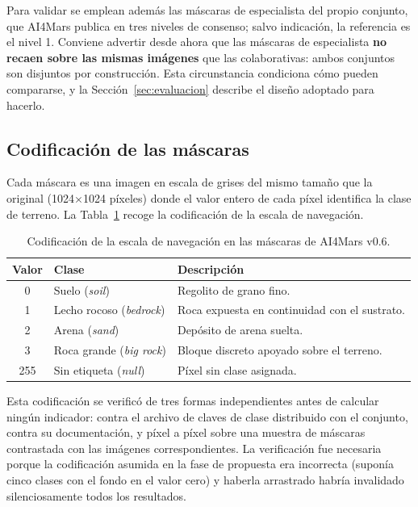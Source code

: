 Para validar se emplean además las \cNGold{} máscaras de especialista del propio conjunto, que
AI4Mars publica en tres niveles de consenso; salvo indicación, la referencia es el nivel 1.
Conviene advertir desde ahora que las máscaras de especialista \textbf{no recaen sobre las
mismas imágenes} que las colaborativas: ambos conjuntos son disjuntos por construcción. Esta
circunstancia condiciona cómo pueden compararse, y la Sección~\ref{sec:evaluacion} describe el
diseño adoptado para hacerlo.

\subsection{Codificación de las máscaras}

Cada máscara es una imagen en escala de grises del mismo tamaño que la original
(\num{1024}$\times$\num{1024} píxeles) donde el valor entero de cada píxel identifica la
clase de terreno. La Tabla~\ref{tab:codificacion} recoge la codificación de la escala de
navegación.

\begin{table}[htbp]
  \centering
  \caption{Codificación de la escala de navegación en las máscaras de AI4Mars v0.6.}
  \label{tab:codificacion}
  \begin{tabular}{clp{7.6cm}}
    \toprule
    \textbf{Valor} & \textbf{Clase} & \textbf{Descripción} \\
    \midrule
    0   & Suelo (\textit{soil})        & Regolito de grano fino. \\
    1   & Lecho rocoso (\textit{bedrock}) & Roca expuesta en continuidad con el sustrato. \\
    2   & Arena (\textit{sand})        & Depósito de arena suelta. \\
    3   & Roca grande (\textit{big rock}) & Bloque discreto apoyado sobre el terreno. \\
    255 & Sin etiqueta (\textit{null}) & Píxel sin clase asignada. \\
    \bottomrule
  \end{tabular}
\end{table}

Esta codificación se verificó de tres formas independientes antes de calcular ningún
indicador: contra el archivo de claves de clase distribuido con el conjunto, contra su
documentación, y píxel a píxel sobre una muestra de máscaras contrastada con las imágenes
correspondientes. La verificación fue necesaria porque la codificación asumida en la fase
de propuesta era incorrecta (suponía cinco clases con el fondo en el valor cero) y
haberla arrastrado habría invalidado silenciosamente todos los resultados.

